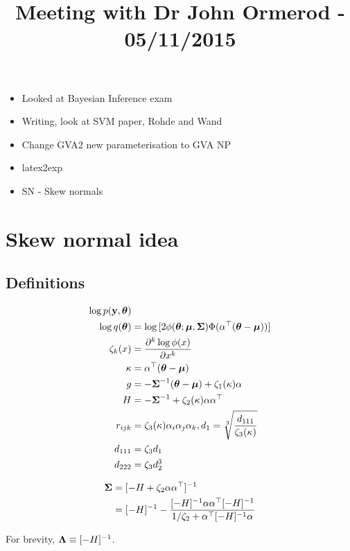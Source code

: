 \documentclass{amsart}
\title{Meeting with Dr John Ormerod - 05/11/2015}
\begin{document}
\maketitle

\begin{itemize}
	\item Looked at Bayesian Inference exam
	\item Writing, look at SVM paper, Rohde and Wand
	\item Change GVA2 new parameterisation to GVA NP
	\item latex2exp
	\item SN - Skew normals
\end{itemize}

\section{Skew normal idea}

\subsection{Definitions}

\begin{align*}
\log p({\bf y}, {\boldsymbol \theta}) & \\
\log q({\boldsymbol \theta}) &= \log{[2 \phi({\boldsymbol\theta};{\boldsymbol\mu}, {\boldsymbol\Sigma}) \Phi(\alpha^\top({\boldsymbol\theta}- {\boldsymbol\mu}))]} \\
\zeta_k(x) & = \frac{\partial^k \log \phi(x)}{\partial x^k} \\
\kappa &= \alpha^\top({\boldsymbol \theta} - {\boldsymbol \mu}) \\
g & = -{\boldsymbol \Sigma}^{-1} ({\boldsymbol \theta} - {\boldsymbol \mu}) + \zeta_1(\kappa) \alpha \\
H & = -{\boldsymbol \Sigma}^{-1} + \zeta_2(\kappa) \alpha \alpha^\top \\
r_{ijk} & = \zeta_3(\kappa) \alpha_i \alpha_j \alpha_k, d_1 = \sqrt[3]{\frac{d_{111}}{\zeta_3(\kappa)}} \\
d_{111} &= \zeta_3 d_1 \\\
d_{222} &= \zeta_3 d_2^3
\end{align*}

\begin{align*}
{\boldsymbol\Sigma} &= [-H + \zeta_2 \alpha \alpha^\top]^{-1} \\
&= [-H]^{-1} - \frac{[-H]^{-1} \alpha \alpha^\top [-H]^{-1}}{1/\zeta_2 + \alpha^\top[-H]^{-1}\alpha} \\
\end{align*}

For brevity, ${\boldsymbol \Lambda} \equiv [-H]^{-1}$.
\end{document}
